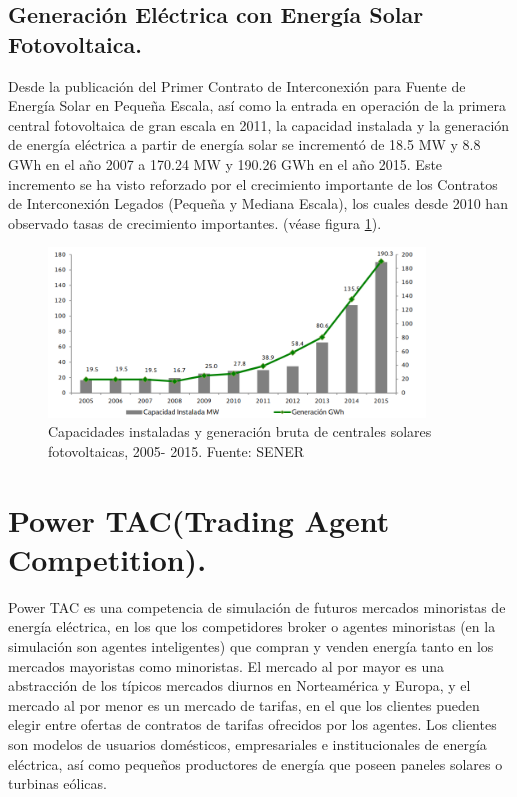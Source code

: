\subsection{Generación Eléctrica con Energía Solar Fotovoltaica.}
Desde la publicación del Primer Contrato de Interconexión para Fuente de Energía Solar en Pequeña Escala, así como la entrada en operación de la primera central fotovoltaica de gran escala en 2011, la capacidad instalada y la generación de energía eléctrica a partir de energía solar se incrementó de 18.5 MW y 8.8 GWh en el año 2007 a 170.24 MW y 190.26 GWh en el año 2015. Este incremento se ha visto reforzado por el crecimiento importante de los Contratos de Interconexión Legados (Pequeña y Mediana Escala), los cuales desde 2010 han observado tasas de crecimiento importantes. (véase figura \ref{solar}).

\begin{figure}[!h]
	\centering
	\includegraphics[width=10cm]{img/solar.png}
	\caption{Capacidades instaladas y generación bruta de centrales solares fotovoltaicas, 2005- 2015. Fuente: SENER}
	\label{solar}
\end{figure}

\section{Power TAC(Trading Agent Competition).}

Power TAC es una competencia de simulación de futuros mercados minoristas de energía eléctrica, en los que los competidores broker o agentes minoristas (en la simulación son agentes inteligentes) que compran y venden energía tanto en los mercados mayoristas como minoristas. 
El mercado al por mayor es una abstracción de los típicos mercados diurnos en Norteamérica y Europa, y el mercado al por menor es un mercado de tarifas, en el que los clientes pueden elegir entre ofertas de contratos de tarifas ofrecidos por los agentes. Los clientes son modelos de usuarios domésticos, empresariales e institucionales de energía eléctrica, así como pequeños productores de energía que poseen paneles solares o turbinas eólicas.\\


